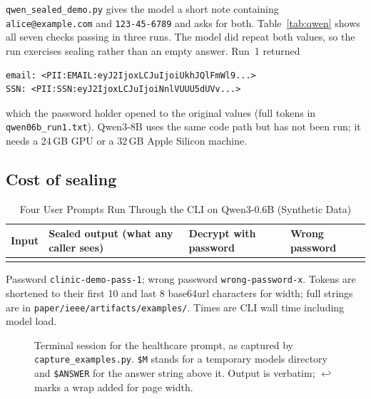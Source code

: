 \documentclass[conference]{IEEEtran}
\newcommand{\code}[1]{\texttt{#1}}
\begin{document}
\code{qwen\_sealed\_demo.py} gives the model a short note containing \code{alice@example.com} and \code{123-45-6789} and asks for both. Table~\ref{tab:qwen} shows all seven checks passing in three runs. The model did repeat both values, so the run exercises sealing rather than an empty answer. Run~1 returned
\begin{lstlisting}[frame=none,aboveskip=2pt]
email: <PII:EMAIL:eyJ2IjoxLCJuIjoiUkhJQlFmWl9...>
SSN: <PII:SSN:eyJ2IjoxLCJuIjoiNnlVUUU5dUVv...>
\end{lstlisting}
which the password holder opened to the original values (full tokens in \code{qwen06b\_run1.txt}). Qwen3-8B uses the same code path but has not been run; it needs a 24\,GB GPU or a 32\,GB Apple Silicon machine.

\subsection{Cost of sealing}

\begin{table}[!t]
\caption{Four User Prompts Run Through the CLI on Qwen3-0.6B (Synthetic Data)}
\label{tab:userio}
\centering
\footnotesize
\renewcommand{\arraystretch}{1.15}
\begin{tabularx}{\textwidth}{@{}P{0.22\textwidth}P{0.29\textwidth}LP{0.10\textwidth}@{}}
\toprule
Input & Sealed output (what any caller sees) & Decrypt with password & Wrong password \\
\midrule
{}
\bottomrule
\end{tabularx}
\par\smallskip\parbox{\textwidth}{\scriptsize Password \code{clinic-demo-pass-1}; wrong password \code{wrong-password-x}. Tokens are shortened to their first 10 and last 8 base64url characters for width; full strings are in \code{paper/ieee/artifacts/examples/}. Times are CLI wall time including model load.}
\end{table}

\begin{figure}[!t]

\caption{Terminal session for the healthcare prompt, as captured by \code{capture\_examples.py}. \code{\$M} stands for a temporary models directory and \code{\$ANSWER} for the answer string above it. Output is verbatim; $\hookleftarrow$ marks a wrap added for page width.}
\label{fig:cli}
\end{figure}
\end{document}
